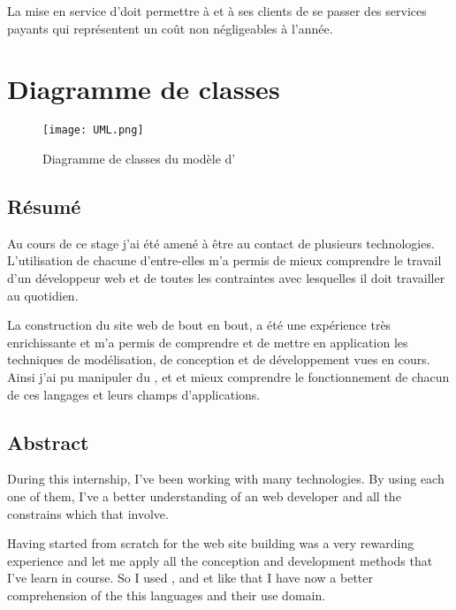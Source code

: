 \documentclass[a4paper, 11pt]{report}
\begin{document}
    La mise en service d'\agenda doit permettre à \lgk et à ses clients de se passer des services payants qui représentent un coût non négligeables à l'année.

\appendix
    \chapter{Diagramme de classes}
    \begin{figure}[!ht]
        \centering
        \texttt{[image: UML.png]}
        \caption{Diagramme de classes du modèle d'\agenda}
        \label{modele}
    \end{figure}




\newpage
\thispagestyle{empty}
    \section*{Résumé}
    Au cours de ce stage j'ai été amené à être au contact de plusieurs technologies. L'utilisation de chacune d'entre-elles m'a permis de mieux comprendre le travail d'un développeur web et de toutes les contraintes avec lesquelles il doit travailler au quotidien.

    La construction du site web de bout en bout, a été une expérience très enrichissante et m'a permis de comprendre et de mettre en application les techniques de modélisation, de conception et de développement vues en cours. Ainsi j'ai pu manipuler du \php, \js et \jq et mieux comprendre le fonctionnement de chacun de ces langages et leurs champs d'applications.
    \section*{Abstract}
    During this internship, I've been working with many technologies. By using each one of them, I've a better understanding of an web developer and all the constrains which that involve.

    Having started from scratch for the web site building was a very rewarding experience and let me apply all the conception and development methods that I've learn in course. So I used \php, \js and \jq et like that I have now a better comprehension of the this languages and their use domain.
\end{document}
